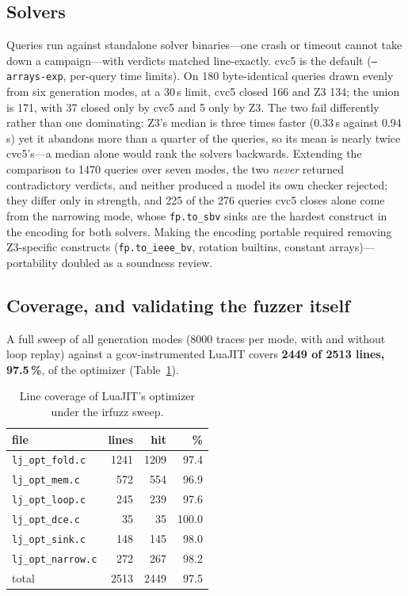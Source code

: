 \documentclass[runningheads]{llncs}
\newif\iffull \fulltrue
\newcommand{\full}[1]{#1}
\newcommand{\cut}[2]{#2}
\newcommand{\full}[1]{}
\newcommand{\cut}[2]{#1}
\newcommand{\irfuzz}{\textsf{irfuzz}}
\begin{document}
\subsection{Solvers}

Queries run against standalone solver binaries\full{---one crash or timeout
cannot take down a campaign}---with verdicts matched line-exactly. cvc5 is
the default\full{ (\texttt{--arrays-exp}, per-query time limits)}.
On 180 byte-identical queries drawn evenly from six generation modes, at a
30\,s limit, cvc5 closed 166 and Z3 134; the union is 171, with 37 closed
only by cvc5 and 5 only by Z3.
\full{The two fail differently rather than one dominating: Z3's median is
three times faster (0.33\,s against 0.94\,s) yet it abandons more than a
quarter of the queries, so its mean is nearly twice cvc5's---a median
alone would rank the solvers backwards.
Extending the comparison to 1470 queries over seven modes, the two
\emph{never} returned contradictory verdicts, and neither produced a model
its own checker rejected; they differ only in strength, and 225 of the 276
queries cvc5 closes alone come from the narrowing mode, whose
\texttt{fp.to\_sbv} sinks are the hardest construct in the encoding for
both solvers.}
Making the encoding portable\full{ required removing
Z3-specific constructs (\texttt{fp.to\_ieee\_bv}, rotation builtins,
constant arrays)---portability} doubled as a soundness review.

\subsection{Coverage, and validating the fuzzer itself}\label{sec:coverage}

A full sweep of all generation modes (8000 traces per mode, with and without
loop replay) against a gcov-instrumented LuaJIT covers \textbf{2449 of 2513
lines, 97.5\,\%}, of the optimizer
\cut{(\texttt{lj\_opt\_fold.c} 97.4\,\%, \texttt{mem} 96.9\,\%,
\texttt{loop} 97.6\,\%, \texttt{dce} 100\,\%, \texttt{sink} 98.0\,\%,
\texttt{narrow} 98.2\,\%)}{(Table~\ref{tab:coverage})}.

\iffull
\begin{table}[t]
\centering
\caption{Line coverage of LuaJIT's optimizer under the \irfuzz{} sweep.}
\label{tab:coverage}
\begin{tabular}{lrrr}
\toprule
file & lines & hit & \% \\
\midrule
\texttt{lj\_opt\_fold.c}   & 1241 & 1209 & 97.4 \\
\texttt{lj\_opt\_mem.c}    &  572 &  554 & 96.9 \\
\texttt{lj\_opt\_loop.c}   &  245 &  239 & 97.6 \\
\texttt{lj\_opt\_dce.c}    &   35 &   35 & 100.0 \\
\texttt{lj\_opt\_sink.c}   &  148 &  145 & 98.0 \\
\texttt{lj\_opt\_narrow.c} &  272 &  267 & 98.2 \\
\midrule
total & 2513 & 2449 & 97.5 \\
\bottomrule
\end{tabular}
\end{table}
\fi %
\end{document}
